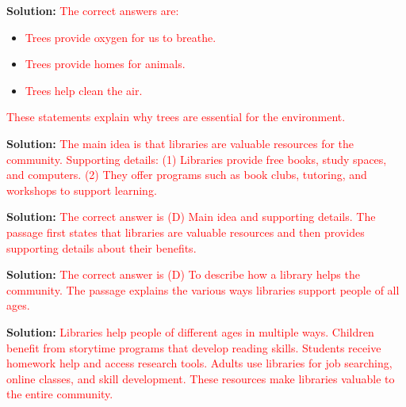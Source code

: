\documentclass[12pt]{article}
\begin{document}
\begin{tcolorbox}[colframe=black!50, colback=white, title=Question 5]
\textbf{Solution:} \textcolor{red}{The correct answers are:}
\begin{itemize}
    \item \textcolor{red}{Trees provide oxygen for us to breathe.}
    \item \textcolor{red}{Trees provide homes for animals.}
    \item \textcolor{red}{Trees help clean the air.}
\end{itemize}
\textcolor{red}{These statements explain why trees are essential for the environment.}
\end{tcolorbox}

\begin{tcolorbox}[colframe=black!50, colback=white, title=Question 6]
\textbf{Solution:} \textcolor{red}{The main idea is that libraries are valuable resources for the community. Supporting details: (1) Libraries provide free books, study spaces, and computers. (2) They offer programs such as book clubs, tutoring, and workshops to support learning.}
\end{tcolorbox}

\begin{tcolorbox}[colframe=black!50, colback=white, title=Question 7]
\textbf{Solution:} \textcolor{red}{The correct answer is (D) Main idea and supporting details. The passage first states that libraries are valuable resources and then provides supporting details about their benefits.}
\end{tcolorbox}

\begin{tcolorbox}[colframe=black!50, colback=white, title=Question 8]
\textbf{Solution:} \textcolor{red}{The correct answer is (D) To describe how a library helps the community. The passage explains the various ways libraries support people of all ages.}
\end{tcolorbox}

\begin{tcolorbox}[colframe=black!50, colback=white, title=Question 9]
\textbf{Solution:} \textcolor{red}{Libraries help people of different ages in multiple ways. Children benefit from storytime programs that develop reading skills. Students receive homework help and access research tools. Adults use libraries for job searching, online classes, and skill development. These resources make libraries valuable to the entire community.}
\end{tcolorbox}
\end{document}
